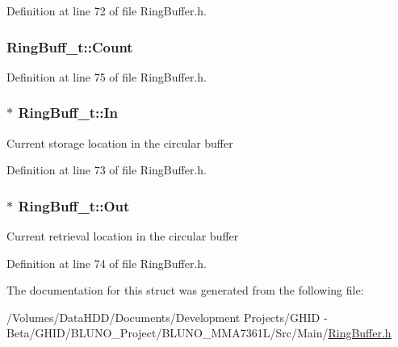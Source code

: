 \-Definition at line 72 of file \-Ring\-Buffer.\-h.

\hypertarget{struct_ring_buff__t_a41a9ebbce17afd63c9b1052b9374ab7f}{
\subsubsection[{\-Count}]{ {\bf \-Ring\-Buff\-\_\-t\-::\-Count}}}\label{struct_ring_buff__t_a41a9ebbce17afd63c9b1052b9374ab7f}


\-Definition at line 75 of file \-Ring\-Buffer.\-h.

\hypertarget{struct_ring_buff__t_ace48fed7a87967d5de48671dcd356ac6}{
\subsubsection[{\-In}]{$\ast$ {\bf \-Ring\-Buff\-\_\-t\-::\-In}}}\label{struct_ring_buff__t_ace48fed7a87967d5de48671dcd356ac6}
\-Current storage location in the circular buffer 

\-Definition at line 73 of file \-Ring\-Buffer.\-h.

\hypertarget{struct_ring_buff__t_adff6acf088e2c9697b9f19fb9ff91739}{
\subsubsection[{\-Out}]{$\ast$ {\bf \-Ring\-Buff\-\_\-t\-::\-Out}}}\label{struct_ring_buff__t_adff6acf088e2c9697b9f19fb9ff91739}
\-Current retrieval location in the circular buffer 

\-Definition at line 74 of file \-Ring\-Buffer.\-h.



\-The documentation for this struct was generated from the following file\-:\begin{DoxyCompactItemize}
\item 
/\-Volumes/\-Data\-H\-D\-D/\-Documents/\-Development Projects/\-G\-H\-I\-D -\/ Beta/\-G\-H\-I\-D/\-B\-L\-U\-N\-O\-\_\-\-Project/\-B\-L\-U\-N\-O\-\_\-\-M\-M\-A7361\-L/\-Src/\-Main/\hyperlink{_ring_buffer_8h}{\-Ring\-Buffer.\-h}\end{DoxyCompactItemize}
